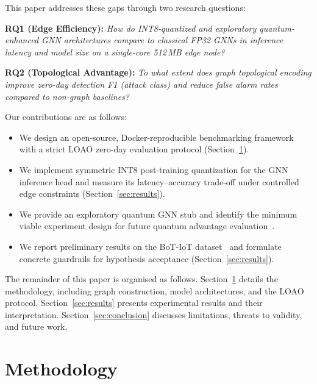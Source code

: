 \documentclass[conference]{IEEEtran}
\begin{document}
This paper addresses these gaps through two research questions:

\smallskip\noindent\textbf{RQ1 (Edge Efficiency):} \emph{How do INT8-quantized
and exploratory quantum-enhanced GNN architectures compare to classical FP32
GNNs in inference latency and model size on a single-core 512\,MB edge node?}

\smallskip\noindent\textbf{RQ2 (Topological Advantage):} \emph{To what extent
does graph topological encoding improve zero-day detection F1 (attack class)
and reduce false alarm rates compared to non-graph baselines?}

\smallskip
Our contributions are as follows:
\begin{itemize}
  \item We design an open-source, Docker-reproducible benchmarking framework
        with a strict LOAO zero-day evaluation protocol
        (Section~\ref{sec:method}).
  \item We implement symmetric INT8 post-training quantization for the GNN
        inference head and measure its latency--accuracy trade-off under
        controlled edge constraints (Section~\ref{sec:results}).
  \item We provide an exploratory quantum GNN stub and identify the minimum
        viable experiment design for future quantum advantage
        evaluation~\cite{farhi2018classification}.
  \item We report preliminary results on the BoT-IoT
        dataset~\cite{koroniotis2019towards} and formulate concrete guardrails
        for hypothesis acceptance (Section~\ref{sec:results}).
\end{itemize}

The remainder of this paper is organised as follows.
Section~\ref{sec:method} details the methodology, including graph construction,
model architectures, and the LOAO protocol.  Section~\ref{sec:results}
presents experimental results and their interpretation.
Section~\ref{sec:conclusion} discusses limitations, threats to validity, and
future work.

\section{Methodology}\label{sec:method}
\end{document}
